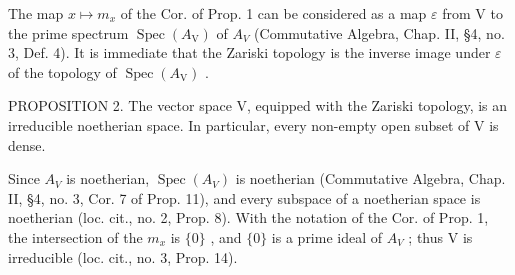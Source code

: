 The map \(x \mapsto m_{x}\) of the Cor. of Prop. 1 can be considered as a map \(\varepsilon\) from V to the prime spectrum \(\operatorname{Spec}(A_{\mathrm{V}})\) of \(A_{V}\) (Commutative Algebra, Chap. II, §4, no. 3, Def. 4). It is immediate that the Zariski topology is the inverse image under \(\varepsilon\) of the topology of \(\operatorname{Spec}(A_{\mathrm{V}})\) .

PROPOSITION 2. The vector space V, equipped with the Zariski topology, is an irreducible noetherian space. In particular, every non-empty open subset of V is dense.

Since \(A_{V}\) is noetherian, \(\operatorname{Spec}(A_{V})\) is noetherian (Commutative Algebra, Chap. II, §4, no. 3, Cor. 7 of Prop. 11), and every subspace of a noetherian space is noetherian (loc. cit., no. 2, Prop. 8). With the notation of the Cor. of Prop. 1, the intersection of the \(m_{x}\) is \(\{0\}\) , and \(\{0\}\) is a prime ideal of \(A_{V}\) ; thus V is irreducible (loc. cit., no. 3, Prop. 14).

